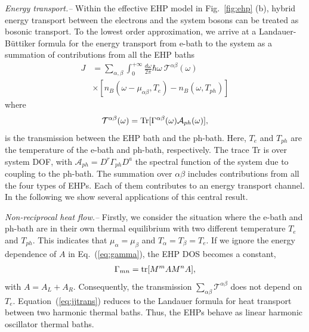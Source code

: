 \documentclass[aps
,twocolumn
,floatfix,footinbib,prl
]{revtex4-1}
\begin{document}
\emph{ Energy transport.--}
Within the effective EHP model in Fig.~\ref{fig:ehp} (b), hybrid energy transport between the electrons and the system bosons can be treated as bosonic transport.
To the lowest order approximation, we arrive at a Landauer-B\"uttiker formula for the energy transport from e-bath to the system as a summation of contributions from all the EHP baths
\begin{align}
J &= \sum_{\alpha,\beta}\int_0^{+\infty}\frac{d\omega}{2\pi}\hbar\omega\ \mathcal{T}^{\alpha\beta}(\omega)\nonumber\\
&\times [n_B(\omega-\mu_{\alpha\beta},{T}_{e})-n_B(\omega,T_{ph})]
\label{eq:jjtrans}
\end{align}
where
\begin{align}
\mathcal{T}^{\alpha\beta}(\omega)={\rm Tr}[\Gamma^{\alpha\beta}(\omega)\mathcal{A}_{ph}(\omega)],
\end{align}
is the transmission between the EHP bath and the ph-bath. 
Here, $T_e$ and $T_{ph}$ are the temperature of the e-bath and ph-bath, respectively. The trace Tr is over system DOF, with $\mathcal{A}_{ph}=D^r \Gamma_{ph} D^a$ the spectral function of the system due to coupling to the ph-bath. The summation over $\alpha\beta$ includes contributions from all the four types of EHPs. Each of them contributes to an energy transport channel. In the following we show several applications of this central result.


\emph{Non-reciprocal heat flow.--}
Firstly, we consider the situation where the e-bath and ph-bath are in their own thermal equilibrium with two different temperature $T_e$ and $T_{ph}$. This indicates that  $\mu_{\alpha}=\mu_{\beta}$ and $T_{\alpha}=T_\beta=T_e$. 
If we ignore the energy dependence of $A$ in Eq.~(\ref{eq:gamma}),
the EHP DOS becomes a constant, 
\begin{align}
\Gamma_{mn}={\rm tr}[M^m A M^n A],
\end{align}
with $A=A_L+A_R$. Consequently,  the transmission $\sum_{\alpha\beta}\mathcal{T}^{\alpha\beta}$ does not depend on $T_e$. Equation~(\ref{eq:jjtrans}) reduces to the Landauer formula for heat transport between two harmonic thermal baths. Thus, the EHPs behave as linear harmonic oscillator thermal baths. 
\end{document}
